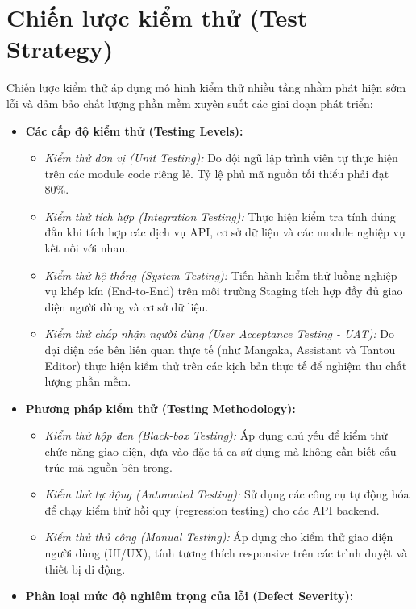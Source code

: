 \section{Chiến lược kiểm thử (Test Strategy)}
\label{sec:test_strategy}

Chiến lược kiểm thử áp dụng mô hình kiểm thử nhiều tầng nhằm phát hiện sớm lỗi và đảm bảo chất lượng phần mềm xuyên suốt các giai đoạn phát triển:

\begin{itemize}
    \item \textbf{Các cấp độ kiểm thử (Testing Levels):}
    \begin{itemize}
        \item \textit{Kiểm thử đơn vị (Unit Testing):} Do đội ngũ lập trình viên tự thực hiện trên các module code riêng lẻ. Tỷ lệ phủ mã nguồn tối thiểu phải đạt $80\%$.
        \item \textit{Kiểm thử tích hợp (Integration Testing):} Thực hiện kiểm tra tính đúng đắn khi tích hợp các dịch vụ API, cơ sở dữ liệu và các module nghiệp vụ kết nối với nhau.
        \item \textit{Kiểm thử hệ thống (System Testing):} Tiến hành kiểm thử luồng nghiệp vụ khép kín (End-to-End) trên môi trường Staging tích hợp đầy đủ giao diện người dùng và cơ sở dữ liệu.
        \item \textit{Kiểm thử chấp nhận người dùng (User Acceptance Testing - UAT):} Do đại diện các bên liên quan thực tế (như Mangaka, Assistant và Tantou Editor) thực hiện kiểm thử trên các kịch bản thực tế để nghiệm thu chất lượng phần mềm.
    \end{itemize}
    \item \textbf{Phương pháp kiểm thử (Testing Methodology):}
    \begin{itemize}
        \item \textit{Kiểm thử hộp đen (Black-box Testing):} Áp dụng chủ yếu để kiểm thử chức năng giao diện, dựa vào đặc tả ca sử dụng mà không cần biết cấu trúc mã nguồn bên trong.
        \item \textit{Kiểm thử tự động (Automated Testing):} Sử dụng các công cụ tự động hóa để chạy kiểm thử hồi quy (regression testing) cho các API backend.
        \item \textit{Kiểm thử thủ công (Manual Testing):} Áp dụng cho kiểm thử giao diện người dùng (UI/UX), tính tương thích responsive trên các trình duyệt và thiết bị di động.
    \end{itemize}
    \item \textbf{Phân loại mức độ nghiêm trọng của lỗi (Defect Severity):}

\end{itemize}
